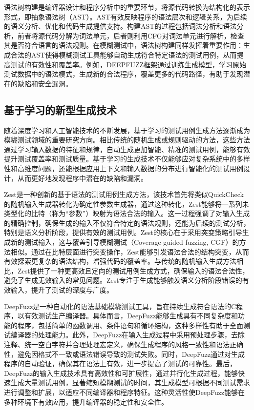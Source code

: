 \documentclass[10.5pt,compsoc]{CjC}
\theoremstyle{mystyle}
\begin{document}
语法树构建是编译器设计和程序分析中的重要环节，将源代码转换为结构化的表示形式，即抽象语法树（AST）。AST有效反映程序的语法层次和逻辑关系，为后续的语义分析、优化和代码生成提供支持。构建AST的过程包括词法分析和语法分析，前者将源代码分解为词法单元，后者则利用CFG对词法单元进行解析，检查其是否符合语言的语法规则。在模糊测试中，语法树构建同样发挥着重要作用：生成合法的AST使得模糊测试工具能够自动生成符合特定语法的测试用例，从而提高测试的有效性和覆盖率。例如，DEEPFUZZ框架通过训练生成模型，学习原始测试数据中的语法模式，生成新的合法程序，覆盖更多的代码路径，有助于发现潜在的缺陷和安全漏洞。
\vspace {10mm}
\subsection{基于学习的新型生成技术}

随着深度学习和人工智能技术的不断发展，基于学习的测试用例生成方法逐渐成为模糊测试领域的重要研究方向。相比传统的随机生成或规则驱动的方法，这些方法通过学习输入数据的特征和规律，自动生成更加智能、精准的测试用例，能够有效提升测试覆盖率和测试质量。基于学习的生成技术不仅能够应对复杂系统中的多样性和高维度问题，还能根据应用上下文和输入数据的分布进行智能化的测试用例设计，从而更好地发现程序中潜在的缺陷和漏洞。

Zest是一种创新的基于语法的测试用例生成方法\cite{zest}，该技术首先将类似QuickCheck的随机输入生成器转化为确定性参数生成器，通过这种转化，Zest能够将一系列未类型化的比特（称为“参数”）映射为语法合法的输入。这一过程强调了对输入生成的精确控制，确保生成的输入不仅符合特定的语法规则，还能为后续的测试分析，特别是语义分析阶段，提供有效的测试用例。Zest的核心在于采用突变策略引导生成新的测试输入，这与覆盖引导模糊测试（Coverage-guided fuzzing, CGF）的方法相似。通过在比特层面进行突变操作，Zest能够引发语法合法的结构突变，从而有效探索更复杂的语法结构，增强代码的覆盖率。与传统的随机输入生成方法相比，Zest提供了一种更高效且定向的测试用例生成方式，确保输入的语法合法性，避免了生成无效输入的常见问题。Zest专注于生成能够触发语义分析阶段错误的有效输入，提升了测试的深度与广度。

DeepFuzz是一种自动化的语法基础模糊测试工具，旨在持续生成符合语法的C程序，以有效测试生产编译器\cite{DeepFuzz}。具体而言，DeepFuzz能够生成具有不同复杂度和功能的程序，包括简单的函数调用、条件语句和循环结构，这种多样性有助于全面测试编译器的处理能力。此外，DeepFuzz在输入生成过程中采用预处理步骤，去除注释、统一空白字符并合理处理宏定义，确保生成程序的风格一致性和语法正确性，避免因格式不一致或语法错误导致的测试失败。同时，DeepFuzz通过对生成程序的自动验证，确保其在语法上有效，进一步提高了测试的可靠性。最后，DeepFuzz的输入生成技术具有高效性和可扩展性，通过并行化生成过程，能够快速生成大量测试用例，显著缩短模糊测试的时间，其生成模型可根据不同测试需求进行调整和扩展，以适应不同编译器和程序特征。这种灵活性使DeepFuzz能够在多种环境下有效应用，提升编译器的稳定性和安全性。
\end{document}
